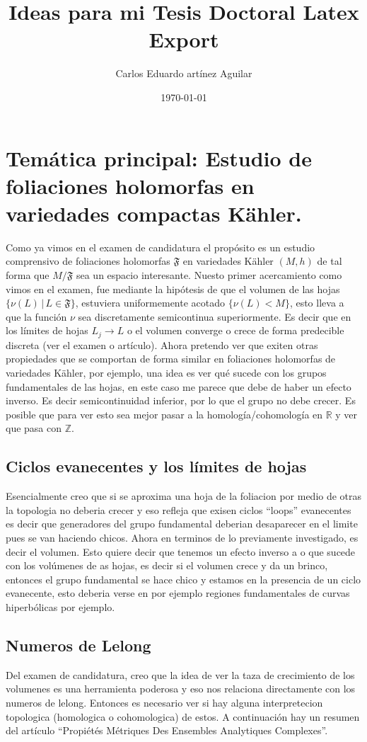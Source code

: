\documentclass[letterpaper]{article}
\author{Carlos Eduardo artínez Aguilar}
\date{\today}
\title{Ideas para mi Tesis Doctoral Latex Export}
\newcommand{\zah}{\ensuremath{ \mathbb Z }}
\newcommand{\re}{\ensuremath{\mathbb R }}
\begin{document}
\maketitle
\tableofcontents


\section{Temática principal: Estudio de foliaciones holomorfas en variedades compactas Kähler.}
\label{sec:orgff7ff59}
\noindent Como ya vimos en el examen de candidatura el propósito es un estudio comprensivo de foliaciones holomorfas \(\mathfrak{F}\) en variedades Kähler \((M,h)\) de tal forma que \(M/\mathfrak{F}\) sea un espacio interesante. Nuesto primer acercamiento como vimos en el examen, fue mediante la hipótesis de que el volumen de las hojas \(\{ \nu(L) \,|\,L\in \mathfrak{F}\}\), estuviera uniformemente acotado \(\{\nu(L) < M\}\), esto lleva a que la función \(\nu\) sea discretamente semicontinua superiormente. Es decir que en los límites de hojas \(L_j\rightarrow L\) o el volumen converge o crece de forma predecible discreta (ver el examen o artículo). Ahora pretendo ver que exiten otras propiedades que se comportan de forma similar en foliaciones holomorfas de variedades Kähler, por ejemplo, una idea es ver qué sucede con los grupos fundamentales de las hojas, en este caso me parece que debe de haber un efecto inverso. Es decir semicontinuidad inferior, por lo que el grupo no debe crecer. Es posible que para ver esto sea mejor pasar a la homología/cohomología en \(\re\) y ver que pasa con \(\zah\).

\subsection{Ciclos evanecentes y los límites de hojas}
\label{sec:org1117e07}
\noindent Esencialmente creo que si se aproxima una hoja de la foliacion por medio de otras la topologia no deberia crecer y eso refleja que exisen ciclos ``loops'' evanecentes es decir que generadores del grupo fundamental deberian desaparecer en el limite pues se van haciendo chicos. Ahora en terminos de lo previamente investigado, es decir el volumen. Esto quiere decir que tenemos un efecto inverso a o que sucede con los volúmenes de as hojas, es decir si el volumen crece y da un brinco, entonces el grupo fundamental se hace chico y estamos en la presencia de un ciclo evanecente, esto deberia verse en por ejemplo regiones fundamentales de curvas hiperbólicas por ejemplo.
\subsection{Numeros de Lelong}
\label{sec:orged26d3d}
\noindent Del examen de candidatura, creo que la idea de ver la taza de crecimiento de los volumenes es una herramienta poderosa y eso nos relaciona directamente con los numeros de lelong. Entonces es necesario ver si hay alguna interpretecion topologica (homologica o cohomologica) de estos. A continuación hay un resumen del artículo ``Propiétés Métriques Des Ensembles Analytiques Complexes''.
\end{document}
